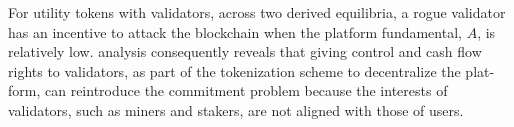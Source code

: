         For utility tokens with validators, across two derived equilibria, a rogue validator has an incentive to attack the blockchain when the platform fundamental, $A$, is relatively low. analysis consequently reveals that giving control and cash flow rights to validators, as part of the tokenization scheme to decentralize the plat-form, can reintroduce the commitment problem because the interests of validators, such as miners and stakers, are not aligned with those of users.